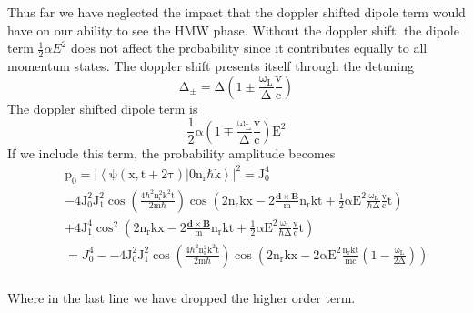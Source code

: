\documentclass[twocolumn,english,pra,aps,superscriptaddress,floatfix]{revtex4-1}
\begin{document}
Thus far we have neglected the impact that the doppler shifted dipole term would have on our ability to see the HMW phase.  Without the doppler shift, the dipole term $\frac{1}{2}\alpha E^2$ does not affect the probability since it contributes equally to all momentum states.  The doppler shift presents itself through the detuning 
\begin{equation}
\mathrm{\Delta_{\pm}=\Delta\left(1\pm \frac{\omega_{L}}{\Delta}\frac{v}{c}\right)}
\end{equation}
The doppler shifted dipole term is
\begin{equation}
\mathrm{\frac{1}{2}\alpha\left(1\mp \frac{\omega_{L}}{\Delta}\frac{v}{c}\right)E^2}
\end{equation}
If we include this term, the probability amplitude becomes
\begin{eqnarray}
&&\mathrm{p_0=|\left<\psi(x,t+2\tau)|0n_r\hbar k\right>|^2=J_0^4}\nonumber \\
&&\mathrm{-4J_0^2J_1^2\cos{\left(\frac{4\hbar^2n_r^2k^2t}{2m\hbar}\right)}\cos{\left(2n_rkx-2\frac{\mathbf{d}\times\mathbf{B}}{m}n_rkt+\frac{1}{2}\alpha E^2\frac{\omega_L}{\hbar \Delta}\frac{v}{c}t\right)}} \nonumber \\
&&\mathrm{+4J_1^4\cos^2{\left(2n_rkx-2\frac{\mathbf{d}\times\mathbf{B}}{m}n_rkt+\frac{1}{2}\alpha E^2\frac{\omega_L}{\hbar \Delta}\frac{v}{c}t\right)}} \nonumber \\
&&=J_0^4-\mathrm{-4J_0^2J_1^2\cos{\left(\frac{4\hbar^2n_r^2k^2t}{2m\hbar}\right)}\cos{\left(2n_rkx-2\alpha E^2\frac{n_rkt}{mc}\left(1-\frac{\omega_L}{2\Delta}\right)\right)}} \nonumber \\
\end{eqnarray}

Where in the last line we have dropped the higher order term. 
\vspace{5mm}
 
\end{document}
